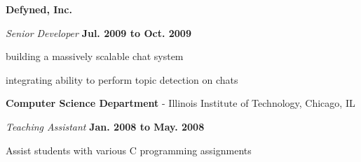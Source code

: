 \documentclass[10pt]{article}
\renewcommand{\section}[2]%
        {\pagebreak[2]\vspace{1.3\baselineskip}%
         \phantomsection\addcontentsline{toc}{section}{#1}%
         \hspace{0in}%
         \marginpar{
         \raggedright \scshape #1}#2}
\newenvironment{outerlist}[1][\enskip\textbullet]%
        {\begin{enumerate}[#1]}{\end{enumerate}%
         \vspace{-.6\baselineskip}}
\newenvironment{innerlist}[1][\enskip\textbullet]%
        {\begin{compactenum}[#1]}{\end{compactenum}}
\newcommand{\blankline}{\quad\pagebreak[2]}
\begin{document}
\blankline

\textbf{Defyned, Inc.}
\begin{outerlist}
	\item[] \textit{Senior Developer} \hfill \textbf{Jul. 2009 to Oct. 2009}
	\begin{innerlist}
		\item building a massively scalable chat system
        \item integrating ability to perform topic detection on chats
	\end{innerlist}
\end{outerlist}

\blankline

\textbf{Computer Science Department} - Illinois Institute of Technology, Chicago, IL
\begin{outerlist}
	\item[] \textit{Teaching Assistant} \hfill \textbf{Jan. 2008 to May. 2008}
	\begin{innerlist}
        \item Assist students with various C programming assignments
	\end{innerlist}
\end{outerlist}


\end{document}
